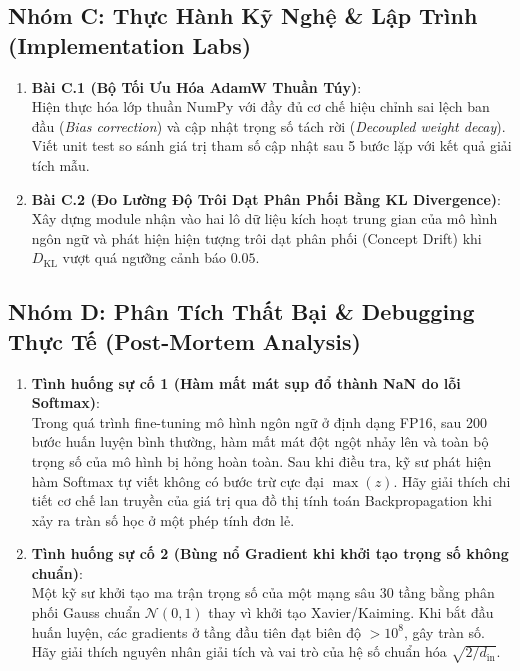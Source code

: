 \subsection{Nhóm C: Thực Hành Kỹ Nghệ \& Lập Trình (Implementation Labs)}
\begin{enumerate}
  \item \textbf{Bài C.1 (Bộ Tối Ưu Hóa AdamW Thuần Túy)}: \\
  Hiện thực hóa lớp  thuần NumPy với đầy đủ cơ chế hiệu chỉnh sai lệch ban đầu (\textit{Bias correction}) và cập nhật trọng số tách rời (\textit{Decoupled weight decay}). Viết unit test so sánh giá trị tham số cập nhật sau 5 bước lặp với kết quả giải tích mẫu.

  \item \textbf{Bài C.2 (Đo Lường Độ Trôi Dạt Phân Phối Bằng KL Divergence)}: \\
  Xây dựng module  nhận vào hai lô dữ liệu kích hoạt trung gian của mô hình ngôn ngữ và phát hiện hiện tượng trôi dạt phân phối (Concept Drift) khi $D_{\text{KL}}$ vượt quá ngưỡng cảnh báo $0.05$.
\end{enumerate}

\subsection{Nhóm D: Phân Tích Thất Bại \& Debugging Thực Tế (Post-Mortem Analysis)}
\begin{enumerate}
  \item \textbf{Tình huống sự cố 1 (Hàm mất mát sụp đổ thành NaN do lỗi Softmax)}: \\
  Trong quá trình fine-tuning mô hình ngôn ngữ ở định dạng FP16, sau 200 bước huấn luyện bình thường, hàm mất mát đột ngột nhảy lên  và toàn bộ trọng số của mô hình bị hỏng hoàn toàn. Sau khi điều tra, kỹ sư phát hiện hàm Softmax tự viết không có bước trừ cực đại $\max(z)$. Hãy giải thích chi tiết cơ chế lan truyền của giá trị  qua đồ thị tính toán Backpropagation khi xảy ra tràn số học ở một phép tính đơn lẻ.

  \item \textbf{Tình huống sự cố 2 (Bùng nổ Gradient khi khởi tạo trọng số không chuẩn)}: \\
  Một kỹ sư khởi tạo ma trận trọng số của một mạng sâu 30 tầng bằng phân phối Gauss chuẩn $\mathcal{N}(0, 1)$ thay vì khởi tạo Xavier/Kaiming. Khi bắt đầu huấn luyện, các gradients ở tầng đầu tiên đạt biên độ $>10^8$, gây tràn số. Hãy giải thích nguyên nhân giải tích và vai trò của hệ số chuẩn hóa $\sqrt{2/d_{\text{in}}}$.
\end{enumerate}

